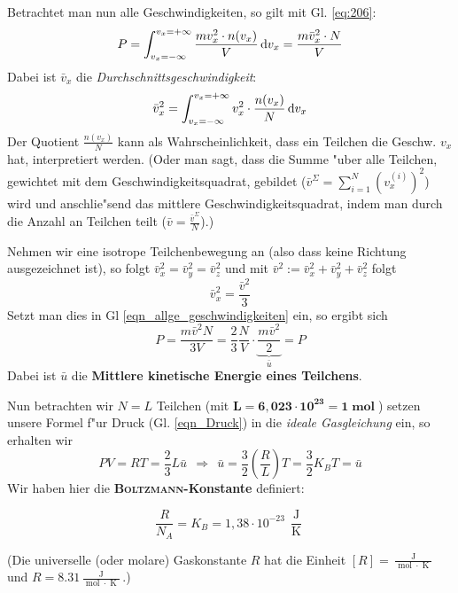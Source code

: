 Betrachtet man nun alle Geschwindigkeiten, so gilt mit
Gl. \eqref{eq:206}:
\begin{equation}
   \label{eqn_allge_geschwindigkeiten}
   P = \int_{ v_x = -\infty }^{ v_x = + \infty } \frac{mv_x^2 \cdot
     n(v_x)}{V} \, \mathrm{d} v_x = 
\frac{m \bar v_x^2 \cdot N}{V}
\end{equation}
Dabei ist $\bar v_x$ die \emph{Durchschnittsgeschwindigkeit}:
$$
\bar v_x^2 = \int_{ v_x = - \infty }^{ v_x = + \infty } v_x^2 \cdot
{\frac{n(v_x)}{N}} \, \mathrm{d} v_x
$$
Der Quotient $\frac{n(v_x)}{N}$ kann als Wahrscheinlichkeit, dass ein
Teilchen die Geschw. $v_x$ hat, interpretiert werden. (Oder man sagt,
dass die Summe "uber alle Teilchen, gewichtet mit dem
Geschwindigkeitsquadrat, gebildet ($\bar v^\Sigma = \sum_{i = 1}^N
(v_x^{(i)})^2$) wird und
anschlie"send das mittlere Geschwindigkeitsquadrat, indem man durch die
Anzahl an Teilchen teilt ($\bar v = \frac{\bar v^\Sigma}{N}$).)

Nehmen wir eine isotrope Teilchenbewegung an (also dass keine Richtung
ausgezeichnet ist), so folgt $\bar v_x^2 = \bar v_y^2 = \bar v_z^2$ und
mit
$
\bar v^2 := \bar v_x^2 + \bar v_y^2 + \bar v_z^2
$
folgt
$$
\bar v_x^2 = \frac{\bar v^2}{3}
$$
Setzt man dies in Gl \eqref{eqn_allge_geschwindigkeiten} ein, so
ergibt sich
\begin{equation}
   \label{eqn_Druck}
   P = \frac{m \bar v^2 N}{3 V} =
\boxed{ \frac{2}{3} \frac{N}{V} \cdot \underbrace{\frac{m \bar
      v^2}{2}}_{\bar u} = P }
\end{equation}
Dabei ist  ${\bar u}$ die \textbf{Mittlere kinetische Energie
  eines Teilchens}.

Nun betrachten wir $N = L$ Teilchen (mit $\mathbf{ L = 6,023 \cdot
  10^{ 23 } = 1 \operatorname{mol}}$) setzen unsere Formel f"ur Druck
(Gl. \eqref{eqn_Druck}) in die \emph{ideale Gasgleichung} ein, so
erhalten wir
\begin{equation}
   \label{eqn_bolzmann-herleitung}
   PV = RT \mathbf = 
\frac{2}{3} L \bar u ~ ~ \Rightarrow ~ ~ 
\bar u = \frac{3}{2} \left( \frac{R}{L} \right ) T = \boxed{\frac{3}{2}
 {K_B} T = \bar u}
\end{equation}
Wir haben hier die
\textbf{\textsc{Boltzmann}-Konstante}
definiert:

\begin{Def}
$$
\frac{R}{N_A} = {K_B} = 1,38 \cdot 10^{ -23 } \,
\frac{\operatorname{J}}{\operatorname{K}}
$$
\end{Def}
(Die universelle (oder molare) Gaskonstante $R$ hat die Einheit $[R] =
\frac{\operatorname{J}}{\operatorname{mol}\cdot \operatorname{K}}$ und
$R = 8.31 \frac{\operatorname{J}}{\operatorname{mol}\cdot \operatorname{K}}$.)

